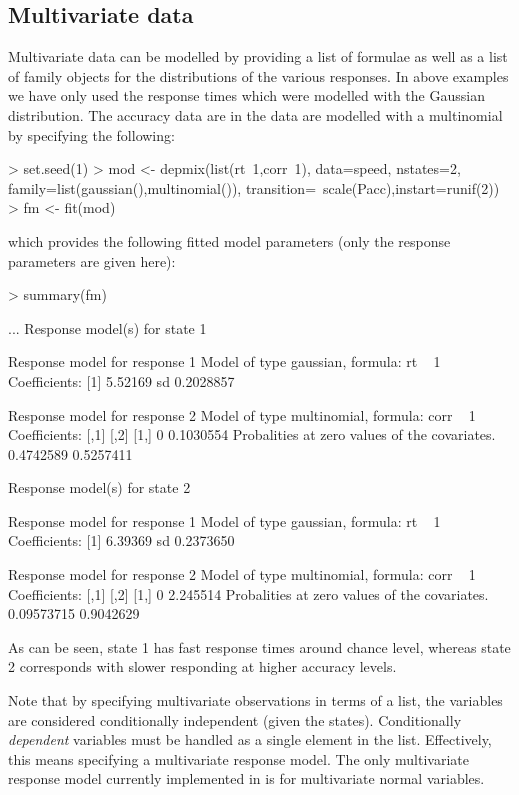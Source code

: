 \documentclass[article]{jss}
\begin{document}
\subsection{Multivariate data}

Multivariate data can be modelled by providing a list of formulae as 
well as a list of family objects for the distributions of the various 
responses. In above examples we have only used the response times 
which were modelled with the Gaussian distribution. The accuracy data 
are in the  data are modelled with a multinomial by 
specifying the following: 
\begin{CodeChunk}
\begin{CodeInput}
> set.seed(1)
> mod <- depmix(list(rt~1,corr~1), data=speed, nstates=2, 
	  family=list(gaussian(),multinomial()),
	  transition=~scale(Pacc),instart=runif(2))
> fm <- fit(mod)
\end{CodeInput}
\end{CodeChunk}
which provides the following fitted model parameters (only the 
response parameters are given here): 
\begin{CodeChunk}
\begin{CodeInput}
> summary(fm)
\end{CodeInput}
\begin{CodeOutput}
...
Response model(s) for state 1 

Response model for response 1 
Model of type gaussian, formula: rt ~ 1
Coefficients: 
[1] 5.52169
sd  0.2028857 

Response model for response 2 
Model of type multinomial, formula: corr ~ 1
Coefficients: 
	 [,1]      [,2]
[1,]    0 0.1030554
Probalities at zero values of the covariates.
0.4742589 0.5257411 

Response model(s) for state 2 

Response model for response 1 
Model of type gaussian, formula: rt ~ 1
Coefficients: 
[1] 6.39369
sd  0.2373650 

Response model for response 2 
Model of type multinomial, formula: corr ~ 1
Coefficients: 
	 [,1]     [,2]
[1,]    0 2.245514
Probalities at zero values of the covariates.
0.09573715 0.9042629 	
\end{CodeOutput}
\end{CodeChunk}
As can be seen, state 1 has fast response times around chance level, 
whereas state 2 corresponds with slower responding at higher accuracy 
levels. 

Note that by specifying multivariate observations in terms of a list, the 
variables are considered conditionally independent (given the states). 
Conditionally \emph{dependent} variables must be handled as a single element in
the list. Effectively, this means specifying a multivariate response model. The 
only multivariate response model currently implemented in  is for
multivariate normal variables.
\end{document}
